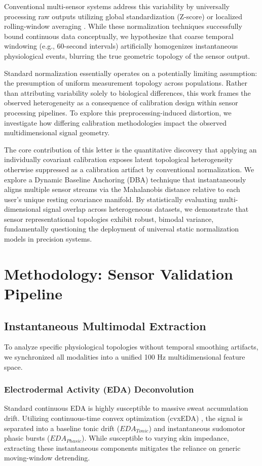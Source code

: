 \documentclass{IEEE_lsens}
\begin{document}
Conventional multi-sensor systems address this variability by universally processing raw outputs utilizing global standardization (Z-score) or localized rolling-window averaging \cite{schmidt2018wesad}. While these normalization techniques successfully bound continuous data conceptually, we hypothesize that coarse temporal windowing (e.g., 60-second intervals) artificially homogenizes instantaneous physiological events, blurring the true geometric topology of the sensor output.

Standard normalization essentially operates on a potentially limiting assumption: the presumption of uniform measurement topology across populations. Rather than attributing variability solely to biological differences, this work frames the observed heterogeneity as a consequence of calibration design within sensor processing pipelines. To explore this preprocessing-induced distortion, we investigate how differing calibration methodologies impact the observed multidimensional signal geometry.

The core contribution of this letter is the quantitative discovery that applying an individually covariant calibration exposes latent topological heterogeneity otherwise suppressed as a calibration artifact by conventional normalization. We explore a Dynamic Baseline Anchoring (DBA) technique that instantaneously aligns multiple sensor streams via the Mahalanobis distance relative to each user's unique resting covariance manifold. By statistically evaluating multi-dimensional signal overlap across heterogeneous datasets, we demonstrate that sensor representational topologies exhibit robust, bimodal variance, fundamentally questioning the deployment of universal static normalization models in precision systems.

\section{Methodology: Sensor Validation Pipeline}

\subsection{Instantaneous Multimodal Extraction}
To analyze specific physiological topologies without temporal smoothing artifacts, we synchronized all modalities into a unified 100 Hz multidimensional feature space.

\subsubsection{Electrodermal Activity (EDA) Deconvolution}
Standard continuous EDA is highly susceptible to massive sweat accumulation drift. Utilizing continuous-time convex optimization (cvxEDA) \cite{cvxeda2015}, the signal is separated into a baseline tonic drift ($EDA_{Tonic}$) and instantaneous sudomotor phasic bursts ($EDA_{Phasic}$). While susceptible to varying skin impedance, extracting these instantaneous components mitigates the reliance on generic moving-window detrending.
\end{document}

